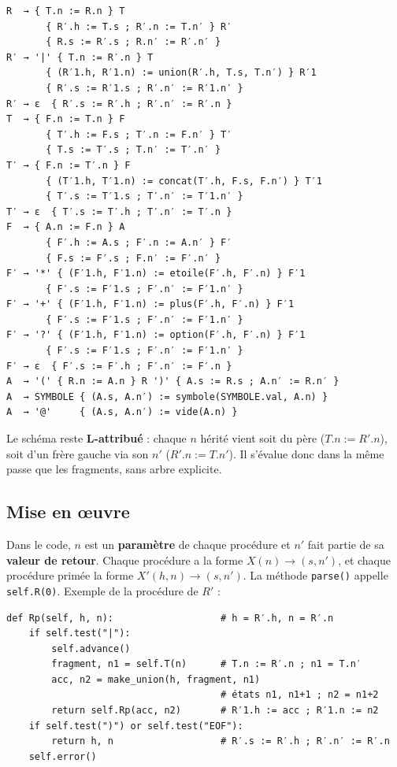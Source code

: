\documentclass[12pt,a4paper]{article}
\newcommand{\code}[1]{{\fontsize{10}{12}\selectfont\texttt{#1}}}
\begin{document}
\begin{lstlisting}[style=schema]
R  → { T.n := R.n } T
       { R′.h := T.s ; R′.n := T.n′ } R′
       { R.s := R′.s ; R.n′ := R′.n′ }
R′ → '|' { T.n := R′.n } T
       { (R′1.h, R′1.n) := union(R′.h, T.s, T.n′) } R′1
       { R′.s := R′1.s ; R′.n′ := R′1.n′ }
R′ → ε  { R′.s := R′.h ; R′.n′ := R′.n }
T  → { F.n := T.n } F
       { T′.h := F.s ; T′.n := F.n′ } T′
       { T.s := T′.s ; T.n′ := T′.n′ }
T′ → { F.n := T′.n } F
       { (T′1.h, T′1.n) := concat(T′.h, F.s, F.n′) } T′1
       { T′.s := T′1.s ; T′.n′ := T′1.n′ }
T′ → ε  { T′.s := T′.h ; T′.n′ := T′.n }
F  → { A.n := F.n } A
       { F′.h := A.s ; F′.n := A.n′ } F′
       { F.s := F′.s ; F.n′ := F′.n′ }
F′ → '*' { (F′1.h, F′1.n) := etoile(F′.h, F′.n) } F′1
       { F′.s := F′1.s ; F′.n′ := F′1.n′ }
F′ → '+' { (F′1.h, F′1.n) := plus(F′.h, F′.n) } F′1
       { F′.s := F′1.s ; F′.n′ := F′1.n′ }
F′ → '?' { (F′1.h, F′1.n) := option(F′.h, F′.n) } F′1
       { F′.s := F′1.s ; F′.n′ := F′1.n′ }
F′ → ε  { F′.s := F′.h ; F′.n′ := F′.n }
A  → '(' { R.n := A.n } R ')' { A.s := R.s ; A.n′ := R.n′ }
A  → SYMBOLE { (A.s, A.n′) := symbole(SYMBOLE.val, A.n) }
A  → '@'     { (A.s, A.n′) := vide(A.n) }
\end{lstlisting}

Le schéma reste \textbf{L-attribué} : chaque $n$ hérité vient soit du père ($T.n := R'.n$), soit
d'un frère gauche via son $n'$ ($R'.n := T.n'$). Il s'évalue donc dans la même passe que les
fragments, sans arbre explicite.

\subsection{Mise en \oe uvre}

Dans le code, $n$ est un \textbf{paramètre} de chaque procédure et $n'$ fait partie de sa
\textbf{valeur de retour}. Chaque procédure a la forme $X(n) \to (s, n')$, et chaque procédure
primée la forme $X'(h, n) \to (s, n')$. La méthode \code{parse()} appelle \code{self.R(0)}.
Exemple de la procédure de $R'$ :

\begin{lstlisting}[style=py]
def Rp(self, h, n):                   # h = R′.h, n = R′.n
    if self.test("|"):
        self.advance()
        fragment, n1 = self.T(n)      # T.n := R′.n ; n1 = T.n′
        acc, n2 = make_union(h, fragment, n1)
                                      # états n1, n1+1 ; n2 = n1+2
        return self.Rp(acc, n2)       # R′1.h := acc ; R′1.n := n2
    if self.test(")") or self.test("EOF"):
        return h, n                   # R′.s := R′.h ; R′.n′ := R′.n
    self.error()
\end{lstlisting}
\end{document}
